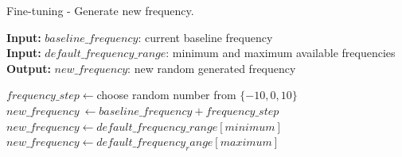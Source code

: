 \begin{algorithm}
    \caption{Fine-tuning - Generate new frequency.}
    \label{alg:fine-frequency}
 \hspace*{\algorithmicindent} \textbf{Input:} $baseline\_frequency$: current baseline frequency \\
 \hspace*{\algorithmicindent} \textbf{Input:} $default\_frequency\_range$: minimum and maximum available frequencies \\
 \hspace*{\algorithmicindent} \textbf{Output:} $new\_frequency$: new random generated frequency
\begin{algorithmic}
\STATE $frequency\_step \leftarrow $choose random number from $\{-10, 0, 10\}$
\STATE $new\_frequency\ \leftarrow baseline\_frequency + frequency\_step$
\STATE $new\_frequency \leftarrow default\_frequency\_range[minimum]$
\STATE $new\_frequency \leftarrow default\_frequency_range[maximum]$
\ENDIF
\end{algorithmic}
\end{algorithm}


